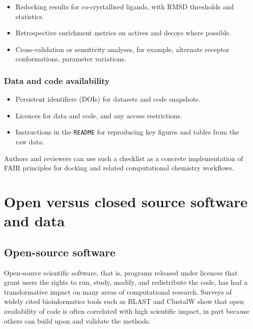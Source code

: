 \documentclass[12pt]{article}
\begin{document}
\begin{itemize}
  \item Redocking results for co-crystallised ligands, with RMSD thresholds and statistics.
  \item Retrospective enrichment metrics on actives and decoys where possible.
  \item Cross-validation or sensitivity analyses, for example, alternate receptor conformations, parameter variations.
\end{itemize}

\subsubsection{Data and code availability}

\begin{itemize}
  \item Persistent identifiers (DOIs) for datasets and code snapshots.
  \item Licences for data and code, and any access restrictions.
  \item Instructions in the \texttt{README} for reproducing key figures and tables from the raw data.
\end{itemize}

Authors and reviewers can use such a checklist as a concrete implementation of FAIR principles for docking and related computational chemistry workflows\cite{CH12_plos2025tenDocking,CH12_mdChecklist2023,CH12_rigorRepro2020}.

\section{Open versus closed source software and data}

\subsection{Open-source software}

Open-source scientific software, that is, programs released under licences that grant users the rights to run, study, modify, and redistribute the code, has had a transformative impact on many areas of computational research\cite{CH12_tenOpenDev,CH12_tenCleanOSS,CH12_fossCase2021}. Surveys of widely cited bioinformatics tools such as BLAST\cite{CH12_madden2013blast} and ClustalW\cite{CH12_thompson2003multiple} show that open availability of code is often correlated with high scientific impact, in part because others can build upon and validate the methods.
\end{document}
